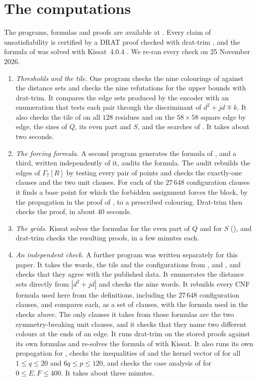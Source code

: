 \documentclass[11pt,colorlinks]{charlie}
\begin{document}
\section{The computations}\label{sec:computations}

The programs, formulas and proofs are available at \coderepo. Every claim of unsatisfiability is certified by a DRAT proof checked with drat-trim \cite{DRAT}, and the formula of  was solved with Kissat~4.0.4 \cite{Kissat}. We re-ran every check on 25 November 2026.

\begin{enumerate}
\item \emph{Thresholds and the tile.} One program checks the nine colourings of  against the distance sets and checks the nine refutations for the upper bounds with drat-trim. It compares the edge sets produced by the encoder with an enumeration that tests each pair through the discriminant of $d^2+jd\mp k$. It also checks the tile of  on all $128$ residues and on the $58\times58$ square edge by edge, the sizes of $Q$, its even part and $S$, and the searches of . It takes about two seconds.
\item \emph{The forcing formula.} A second program generates the formula of , and a third, written independently of it, audits the formula. The audit rebuilds the edges of $\Gamma_7[R]$ by testing every pair of points and checks the exactly-one clauses and the two unit clauses. For each of the $27\,648$ configuration clauses it finds a base point for which the forbidden assignment forces the block, by the propagation in the proof of , to a prescribed colouring. Drat-trim then checks the proof, in about $40$ seconds.
\item \emph{The grids.} Kissat solves the formulas for the even part of $Q$ and for $S$ (), and drat-trim checks the resulting proofs, in a few minutes each.
\item \emph{An independent check.} A further program was written separately for this paper. It takes the words, the tile and the configurations from ,  and , and checks that they agree with the published data. It enumerates the distance sets directly from $|d^2+jd|$ and checks the nine words. It rebuilds every CNF formula used here from the definitions, including the $27\,648$ configuration clauses, and compares each, as a set of clauses, with the formula used in the checks above. The only clauses it takes from those formulas are the two symmetry-breaking unit clauses, and it checks that they name two different colours at the ends of an edge. It runs drat-trim on the stored proofs against its own formulas and re-solves the formula of  with Kissat. It also runs its own propagation for , checks the inequalities of  and the kernel vector of  for all $1\le q\le20$ and $6q\le p\le120$, and checks the case analysis of  for $0\le E,F\le400$. It takes about three minutes.
\end{enumerate}
\end{document}
